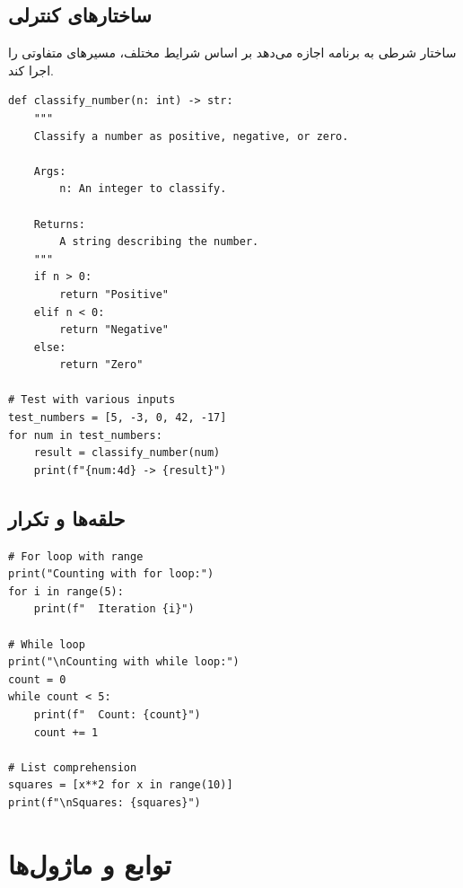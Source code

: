 \documentclass{matinbook}
\begin{document}
\section{ساختارهای کنترلی}

\begin{definition}
    ساختار شرطی به برنامه
    اجازه می‌دهد بر اساس شرایط مختلف،
    مسیرهای متفاوتی را اجرا کند.
    \label{def:conditional}
\end{definition}

\begin{latin}
\begin{verbatim}
def classify_number(n: int) -> str:
    """
    Classify a number as positive, negative, or zero.
    
    Args:
        n: An integer to classify.
    
    Returns:
        A string describing the number.
    """
    if n > 0:
        return "Positive"
    elif n < 0:
        return "Negative"
    else:
        return "Zero"

# Test with various inputs
test_numbers = [5, -3, 0, 42, -17]
for num in test_numbers:
    result = classify_number(num)
    print(f"{num:4d} -> {result}")
\end{verbatim}
\end{latin}
\label{code:conditional}

\section{حلقه‌ها و تکرار}

\begin{latin}
\begin{verbatim}
# For loop with range
print("Counting with for loop:")
for i in range(5):
    print(f"  Iteration {i}")

# While loop
print("\nCounting with while loop:")
count = 0
while count < 5:
    print(f"  Count: {count}")
    count += 1

# List comprehension
squares = [x**2 for x in range(10)]
print(f"\nSquares: {squares}")
\end{verbatim}
\end{latin}
\label{code:loops}

\chapter{توابع و ماژول‌ها}
\label{chap:functions}
\end{document}
